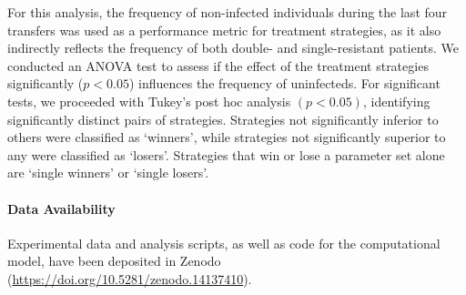 For this analysis, the frequency of non-infected individuals during the last four transfers was used as a performance metric for treatment strategies, as it also indirectly reflects the frequency of both double- and single-resistant patients.
We conducted an ANOVA test to assess if the effect of the treatment strategies significantly ($p<0.05$) influences the frequency of uninfecteds. 
For significant tests, we proceeded with Tukey's post hoc analysis \((p < 0.05)\), identifying significantly distinct pairs of strategies. 
Strategies not significantly inferior to others were classified as `winners', while strategies not significantly superior to any were classified as `losers'.
Strategies that win or lose a parameter set alone are `single winners' or `single losers'. 

\paragraph{Data Availability}
Experimental data and analysis scripts, as well as code for the computational model, have been deposited in Zenodo (\url{https://doi.org/10.5281/zenodo.14137410}).

